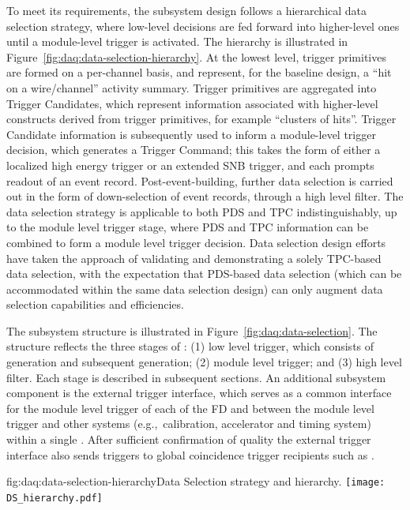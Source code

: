 To meet its requirements, the  subsystem design follows
a hierarchical data selection strategy, where low-level
decisions are fed forward into higher-level ones until a  module-level
trigger is activated. 
 The hierarchy
is illustrated in Figure~\ref{fig:daq:data-selection-hierarchy}. 
At the lowest level, trigger
primitives are formed on a per-channel basis, and represent, for the
baseline design, a ``hit on
a wire/channel'' activity summary. Trigger primitives are aggregated
into Trigger Candidates, which represent information associated with
higher-level constructs derived from trigger primitives,
for example
``clusters of hits''. Trigger
Candidate information is subsequently used to inform a module-level trigger decision, which
generates a Trigger Command; this takes the form of either a localized high energy
trigger or an extended SNB trigger, and each prompts readout of an
event record. Post-event-building, further data selection is carried
out in the form of down-selection of event records, through a high
level filter. The data selection strategy is applicable to both PDS
and TPC indistinguishably, up to the module level trigger stage, where
PDS and TPC information can be combined to form a module level trigger
decision. Data selection design efforts
have taken the approach of validating and demonstrating a solely
TPC-based data selection, with the expectation that PDS-based data
selection (which can be accommodated within the same data selection design)
can only augment data selection capabilities and
efficiencies.

The subsystem structure is illustrated in
Figure~\ref{fig:daq:data-selection}. The structure
reflects the three stages of : (1) low level trigger, which consists of
 generation and subsequent
 generation; (2) module level trigger; and (3)
high level filter. Each stage is described in subsequent
sections. An additional subsystem component is the external trigger interface,
which serves as a common interface for the
module level trigger of each of the FD  and between
the module level trigger and other systems (e.g.,~calibration,
accelerator and timing system) within a single
. After sufficient confirmation of quality the
external trigger interface also sends  triggers
to global coincidence trigger recipients such as   \cite{xx}.

\begin{dunefigure}{fig:daq:data-selection-hierarchy}{Data Selection
    strategy and hierarchy.}
  \texttt{[image: DS\_hierarchy.pdf]}
\end{dunefigure}

